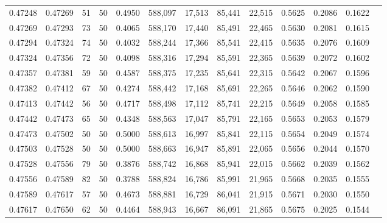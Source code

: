 \begin{tabular}{rrrrrrrrrrrrr}
0.47248 & 0.47269 &    51 &  50 &                                     0.4950 & 588,097 &  17,513 &  85,441 &  22,515 & 0.5625 & 0.2086 & 0.1622 \\
0.47269 & 0.47293 &    73 &  50 &                                     0.4065 & 588,170 &  17,440 &  85,491 &  22,465 & 0.5630 & 0.2081 & 0.1615 \\
0.47294 & 0.47324 &    74 &  50 &                                     0.4032 & 588,244 &  17,366 &  85,541 &  22,415 & 0.5635 & 0.2076 & 0.1609 \\
0.47324 & 0.47356 &    72 &  50 &                                     0.4098 & 588,316 &  17,294 &  85,591 &  22,365 & 0.5639 & 0.2072 & 0.1602 \\
0.47357 & 0.47381 &    59 &  50 &                                     0.4587 & 588,375 &  17,235 &  85,641 &  22,315 & 0.5642 & 0.2067 & 0.1596 \\
0.47382 & 0.47412 &    67 &  50 &                                     0.4274 & 588,442 &  17,168 &  85,691 &  22,265 & 0.5646 & 0.2062 & 0.1590 \\
0.47413 & 0.47442 &    56 &  50 &                                     0.4717 & 588,498 &  17,112 &  85,741 &  22,215 & 0.5649 & 0.2058 & 0.1585 \\
0.47442 & 0.47473 &    65 &  50 &                                     0.4348 & 588,563 &  17,047 &  85,791 &  22,165 & 0.5653 & 0.2053 & 0.1579 \\
0.47473 & 0.47502 &    50 &  50 &                                     0.5000 & 588,613 &  16,997 &  85,841 &  22,115 & 0.5654 & 0.2049 & 0.1574 \\
0.47503 & 0.47528 &    50 &  50 &                                     0.5000 & 588,663 &  16,947 &  85,891 &  22,065 & 0.5656 & 0.2044 & 0.1570 \\
0.47528 & 0.47556 &    79 &  50 &                                     0.3876 & 588,742 &  16,868 &  85,941 &  22,015 & 0.5662 & 0.2039 & 0.1562 \\
0.47556 & 0.47589 &    82 &  50 &                                     0.3788 & 588,824 &  16,786 &  85,991 &  21,965 & 0.5668 & 0.2035 & 0.1555 \\
0.47589 & 0.47617 &    57 &  50 &                                     0.4673 & 588,881 &  16,729 &  86,041 &  21,915 & 0.5671 & 0.2030 & 0.1550 \\
0.47617 & 0.47650 &    62 &  50 &                                     0.4464 & 588,943 &  16,667 &  86,091 &  21,865 & 0.5675 & 0.2025 & 0.1544 \\

\end{tabular}
